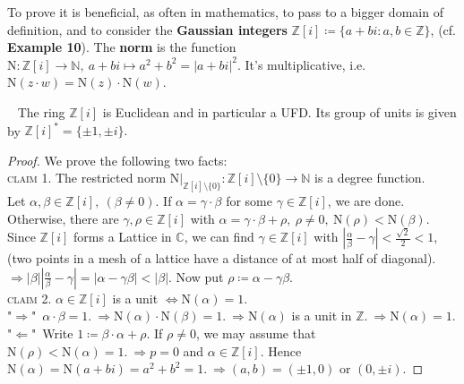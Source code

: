 \documentclass[12pt,a4paper,footinclude=true,headinclude=true]{scrbook} %
\newenvironment{proposition}[2][]
{\renewcommand\theinnercustomprop{#2}\innercustomprop[#1] 
\begin{mdframed}[backgroundcolor=gray!20]\ }
{\end{mdframed}\endinnercustomprop}
\begin{document}
To prove  it is beneficial, as often in mathematics, to pass to a bigger domain of definition, and to consider the \textbf{Gaussian integers} $\mathbb{Z}[i]\coloneqq\{ a+bi:a,b\in\mathbb{Z}\}$, (cf. \textbf{Example 10}). 
The \textbf{norm} is the function $\mathrm{N}:\mathbb{Z}[i]\to\mathbb{N},\ a+bi\mapsto a^2+b^2=|a+bi|^2$. It's multiplicative, i.e. $\mathrm{N}(z\cdot w)= \mathrm{N}(z)\cdot\mathrm{N}(w)$.

\begin{proposition}{88}
    The ring $\mathbb{Z}[i]$ is Euclidean and in particular a UFD. Its group of units is given by $\mathbb{Z}[i]^\ast=\{\pm1,\pm i\}.$
\end{proposition}
\begin{proof}
    We prove the following two facts:\\
    \textsc{claim 1.}
    The restricted norm $\mathrm{N}\big|_{\mathbb{Z}[i]\setminus\{0\}}: \mathbb{Z}[i]\setminus\{0\}\to\mathbb{N}$ is a degree function.\\ Let $\alpha,\beta\in\mathbb{Z}[i],\ (\beta\neq0)$. If $\alpha=\gamma\cdot\beta$ for some $\gamma\in\mathbb{Z}[i]$, we are done. Otherwise, there are $\gamma,\rho\in\mathbb{Z}[i]$ with $\alpha=\gamma\cdot\beta+\rho,\ \rho\neq0,\ \mathrm{N}(\rho)<\mathrm{N}(\beta)$. Since $\mathbb{Z}[i]$ forms a Lattice in $\mathbb{C}$, we can find $\gamma\in\mathbb{Z}[i]$ with $|\frac{\alpha}{\beta}-\gamma|<\frac{\sqrt{2}}{2}<1$, (two points in a mesh of a lattice have a distance of at most half of diagonal). $\Rightarrow |\beta| |\frac{\alpha}{\beta}-\gamma|=|\alpha-\gamma\beta|<|\beta|$. Now put $\rho\coloneqq\alpha-\gamma\beta$.\\
    \textsc{claim 2.}
    $\alpha\in\mathbb{Z}[i]$ is a unit $\Leftrightarrow \mathrm{N}(\alpha) =1$.\\ "$\Rightarrow$"\ $\alpha\cdot\beta=1.\ \Rightarrow \mathrm{N}(\alpha)\cdot \mathrm{N}(\beta)=1.\ \Rightarrow \mathrm{N}(\alpha)$ is a unit in $\mathbb{Z}.\ \Rightarrow \mathrm{N}(\alpha)=1$. \\ "$\Leftarrow$"\ Write $1\coloneqq\beta\cdot \alpha+\rho$. If $\rho\neq0$, we may assume that $\mathrm{N}(\rho)<\mathrm{N}(\alpha)=1.\ \Rightarrow p=0$ and $\alpha\in\mathbb{Z}[i]$. Hence $\mathrm{N}(\alpha)=\mathrm{N}(a+bi)=a^2+b^2=1.\ \Rightarrow (a,b)=(\pm1,0)$ or $(0,\pm i)$.
\end{proof}
\end{document}
